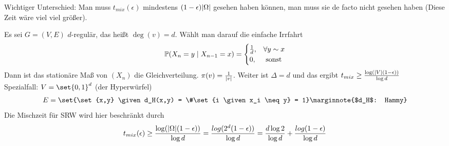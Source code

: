 Wichtiger Unterschied: Man muss $t_{mix}(\epsilon)$ mindestens $(1-\epsilon)\lvert\Omega\rvert$ gesehen haben können, man muss sie de facto nicht gesehen haben (Diese Zeit wäre viel viel größer). 
\begin{beispiel}
	Es sei $G = (V,E)$ $d$-regulär, das heißt $\deg(v) = d$. Wählt man darauf die einfache Irrfahrt 
	\begin{gather}
		\prop{X_n = y \given X_{n-1} = x} = 
		\begin{cases}
			\frac{1}{d}, & \forall y \sim x \\
			0, & \text{ sonst} 
		\end{cases}
	\end{gather}
	Dann ist das stationäre Maß von $(X_n)$ die Gleichverteilung. $\pi(v)= \frac{1}{\lvert v\rvert}$. Weiter ist $\Delta = d$ und das ergibt $t_{mix} \geq \frac{\log( \lvert V\rvert(1-\epsilon))}{\log d}$ \\
	Spezialfall: $V = \set{0,1}^d$ (der Hyperwürfel)
	\begin{align}
		E = \set{\set{x,y} \given d_H(x,y) = \#\set{i \given x_i \neq y} = 1} \marginnote{$d_H$: Hammy}
	\end{align}
	Die Mischzeit für SRW wird hier beschränkt durch
	\begin{align}
		t_{mix}(\epsilon) \geq \frac{\log(\lvert\Omega\rvert (1-\epsilon))}{\log d} = \frac{log(2^d (1-\epsilon) )}{\log d} = \frac{d \log 2}{\log d} + \frac{log(1-\epsilon)}{\log d}
	\end{align}
\end{beispiel}

